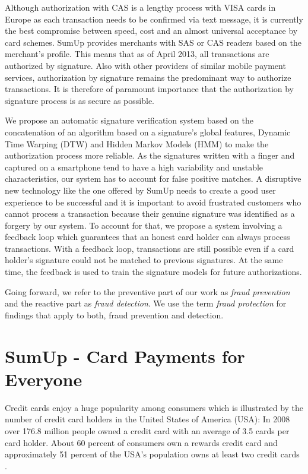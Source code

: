 \documentclass[a4paper, oneside]{csthesis}
\begin{document}
Although authorization with CAS is a lengthy process with VISA cards in Europe as each transaction needs to be confirmed via text message, it is currently the best compromise between speed, cost and an almost universal acceptance by card schemes. SumUp provides merchants with SAS or CAS readers based on the merchant's profile. This means that as of April 2013, all transactions are authorized by signature. Also with other providers of similar mobile payment services, authorization by signature remains the predominant way to authorize transactions. It is therefore of paramount importance that the authorization by signature process is as secure as possible.

We propose an automatic signature verification system based on the concatenation of an algorithm based on a signature's global features, Dynamic Time Warping (DTW) and Hidden Markov Models (HMM) to make the authorization process more reliable. As the signatures written with a finger and captured on a smartphone tend to have a high variability and unstable characteristics, our system has to account for false positive matches. A disruptive new technology like the one offered by SumUp needs to create a good user experience to be successful and it is important to avoid frustrated customers who cannot process a transaction because their genuine signature was identified as a forgery by our system. To account for that, we propose a system involving a feedback loop which guarantees that an honest card holder can always process transactions. With a feedback loop, transactions are still possible even if a card holder's signature could not be matched to previous signatures. At the same time, the feedback is used to train the signature models for future authorizations.

Going forward, we refer to the preventive part of our work as \emph{fraud prevention} and the reactive part as \emph{fraud detection}. We use the term \emph{fraud protection} for findings that apply to both, fraud prevention and detection.



\section{SumUp - Card Payments for Everyone}
\label{intro-sumup}

Credit cards enjoy a huge popularity among consumers which is illustrated by the number of credit card holders in the United States of America (USA): In 2008 over 176.8 million people owned a credit card with an average of 3.5 cards per card holder. About 60 percent of consumers own a rewards credit card and approximately 51 percent of the USA's population owns at least two credit cards \cite{woolsey2010credit}.
\end{document}
